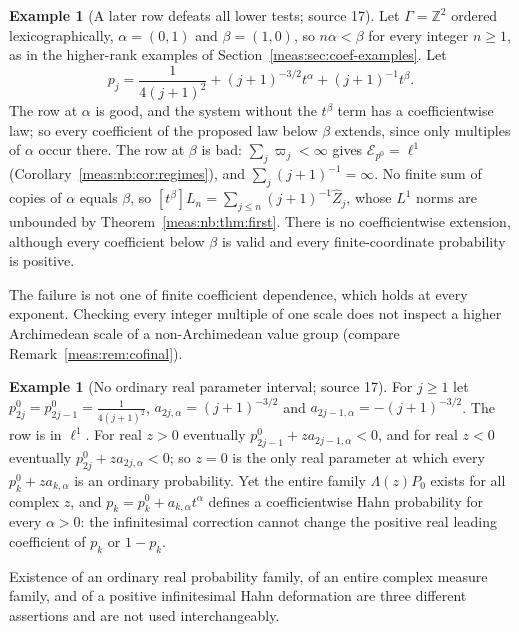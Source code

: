 \documentclass[11pt]{article}
\numberwithin{equation}{section}
\theoremstyle{definition}
\newtheorem{example}[theorem]{Example}
\theoremstyle{remark}
\newcommand{\Z}{\mathbb Z}
\newcommand{\coef}[2]{[t^{#1}]#2}
\newcommand{\Zh}{\widehat Z}
\newcommand{\Erow}{\mathcal E_{p^0}}
\begin{document}
\begin{example}[A later row defeats all lower tests; source 17]
\label{meas:nb:ex:ranktwo}
Let $\Gamma=\Z^2$ ordered lexicographically, $\alpha=(0,1)$ and $\beta=(1,0)$, so
$n\alpha<\beta$ for every integer $n\ge1$, as in the higher-rank examples of
Section~\ref{meas:sec:coef-examples}. Let
\begin{equation}\label{meas:nb:eq:ranktwo-input}
 p_j=\frac1{4(j+1)^2}+(j+1)^{-3/2}t^\alpha+(j+1)^{-1}t^\beta .
\end{equation}
The row at $\alpha$ is good, and the system without the $t^\beta$ term has a
coefficientwise law; so every coefficient of the proposed law below $\beta$ extends,
since only multiples of $\alpha$ occur there. The row at $\beta$ is bad:
$\sum_j\varpi_j<\infty$ gives $\Erow=\ell^1$ (Corollary~\ref{meas:nb:cor:regimes}), and
$\sum_j(j+1)^{-1}=\infty$. No finite sum of copies of $\alpha$ equals $\beta$, so
$\coef\beta{L_n}=\sum_{j\le n}(j+1)^{-1}\Zh_j$, whose $L^1$ norms are unbounded by
Theorem~\ref{meas:nb:thm:first}. There is no coefficientwise extension, although every
coefficient below $\beta$ is valid and every finite-coordinate probability is
positive.
\end{example}

The failure is not one of finite coefficient dependence, which holds at every
exponent. Checking every integer multiple of one scale does not inspect a higher
Archimedean scale of a non-Archimedean value group (compare
Remark~\ref{meas:rem:cofinal}).

\begin{example}[No ordinary real parameter interval; source 17]
\label{meas:nb:ex:noreal}
For $j\ge1$ let $p_{2j}^0=p_{2j-1}^0=\frac1{4(j+1)^2}$, $a_{2j,\alpha}=(j+1)^{-3/2}$ and
$a_{2j-1,\alpha}=-(j+1)^{-3/2}$. The row is in $\ell^1$. For real $z>0$ eventually
$p_{2j-1}^0+za_{2j-1,\alpha}<0$, and for real $z<0$ eventually $p_{2j}^0+za_{2j,\alpha}<0$;
so $z=0$ is the only real parameter at which every $p_k^0+za_{k,\alpha}$ is an ordinary
probability. Yet the entire family $\Lambda(z)P_0$ exists for all complex $z$, and
$p_k=p_k^0+a_{k,\alpha}t^\alpha$ defines a coefficientwise Hahn probability for every
$\alpha>0$: the infinitesimal correction cannot change the positive real leading
coefficient of $p_k$ or $1-p_k$.
\end{example}

Existence of an ordinary real probability family, of an entire complex measure
family, and of a positive infinitesimal Hahn deformation are three different
assertions and are not used interchangeably.
\end{document}
